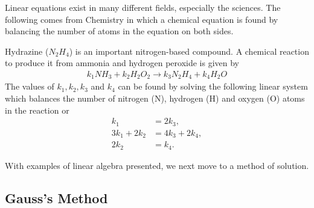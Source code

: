Linear equations exist in many different fields, especially the sciences.  The following comes from Chemistry in which a chemical equation is found by balancing the number of atoms in the equation on both sides.  

\begin{example} \label{ex:hydrazine}
Hydrazine ($N_2H_4$)  is an important nitrogen-based com\-pound.  A chemical reaction to produce it from ammonia and hydrogen peroxide is given by
%
\begin{align*}
k_1 NH_3 + k_2 H_2O_2 \rightarrow k_3 N_2 H_4 + k_4 H_2 O 
\end{align*}
%
The values of $k_1, k_2, k_3$ and $k_4$ can be found by solving the following linear system which balances the number of nitrogen (N), hydrogen (H) and oxygen (O) atoms in the reaction or
%
\begin{align*}
k_1 & = 2k_3, \\
3k_1 + 2k_2 & = 4k_3 + 2k_4, \\
2k_2 & = k_4.
\end{align*}
\end{example}

With examples of linear algebra presented, we next move to a method of solution. 

\subsection{Gauss's Method}

